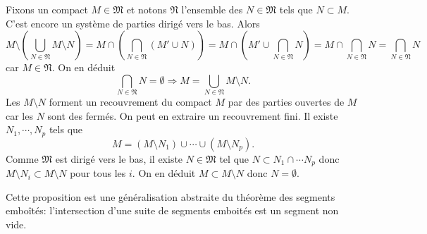 \begin{demo}
Fixons un compact $M\in \mathfrak{M}$ et notons $\mathfrak{N}$ l'ensemble des $N\in \mathfrak{M}$ tels que $N \subset M$. C'est encore un système de parties dirigé vers le bas. Alors
\begin{displaymath}
 M \setminus \left( \bigcup_{N \in \mathfrak{N}} M\setminus N\right)
 =  M \cap \left( \bigcap_{N \in \mathfrak{N}} (M' \cup N)\right)
 =  M \cap \left( M' \cup \bigcap_{N \in \mathfrak{N}}  N\right)
 =  M \cap  \bigcap_{N \in \mathfrak{N}}N
 = \bigcap_{N \in \mathfrak{N}}N
\end{displaymath}
car $M \in \mathfrak{N}$. On en déduit
\begin{displaymath}
 \bigcap_{N \in \mathfrak{N}}N = \emptyset \Rightarrow M = \bigcup_{N \in \mathfrak{N}} M\setminus N.
\end{displaymath}
Les $M\setminus N$ forment un recouvrement du compact $M$ par des parties ouvertes de $M$ car les $N$ sont des fermés. On peut en extraire un recouvrement fini. Il existe $N_1, \cdots, N_p$ tels que
\begin{displaymath}
 M = (M\setminus N_1) \cup \cdots \cup (M\setminus N_p).
\end{displaymath}
Comme $\mathfrak{M}$ est dirigé vers le bas, il existe $N \in \mathfrak{M}$ tel que $N \subset N_1 \cap \cdots N_p$ donc $M \setminus N_i \subset M \setminus N$ pour tous les $i$. On en déduit $M \subset M \setminus N$ donc $N = \emptyset$.
\end{demo}
Cette proposition est une généralisation abstraite du théorème des segments emboîtés: l'intersection d'une suite de segments emboités est un segment non vide.

